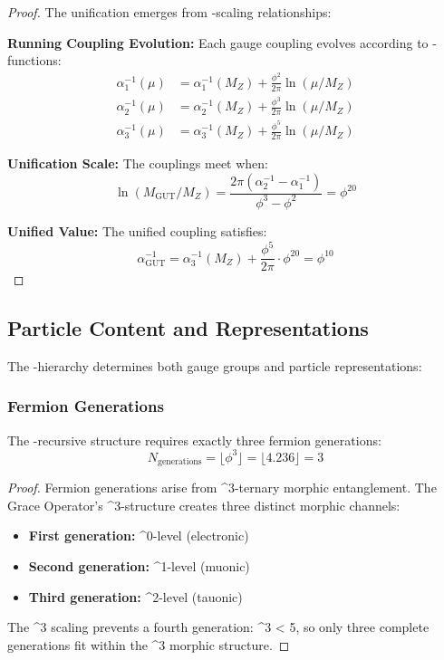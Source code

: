 \begin{proof}
The unification emerges from \phi-scaling relationships:

\textbf{Running Coupling Evolution:} Each gauge coupling evolves according to \phi-\beta functions:
\begin{align}
\alpha_1^{-1}(\mu) &= \alpha_1^{-1}(M_Z) + \frac{\phi^2}{2π} \ln(\mu/M_Z) \\
\alpha_2^{-1}(\mu) &= \alpha_2^{-1}(M_Z) + \frac{\phi^3}{2π} \ln(\mu/M_Z) \\
\alpha_3^{-1}(\mu) &= \alpha_3^{-1}(M_Z) + \frac{\phi^5}{2π} \ln(\mu/M_Z)
\end{align}

\textbf{Unification Scale:} The couplings meet when:
\begin{equation}
\ln(M_{\text{GUT}}/M_Z) = \frac{2π(\alpha_2^{-1} - \alpha_1^{-1})}{\phi^3 - \phi^2} = \phi^{20}
\end{equation}

\textbf{Unified Value:} The unified coupling satisfies:
\begin{equation}
\alpha_{\text{GUT}}^{-1} = \alpha_3^{-1}(M_Z) + \frac{\phi^5}{2π} \cdot \phi^{20} = \phi^{10}
\end{equation}
\end{proof}

\subsection{Particle Content and Representations}

The \phi-hierarchy determines both gauge groups and particle representations:

\subsubsection{Fermion Generations}

\begin{theorem}
The \phi-recursive structure requires exactly three fermion generations:
\begin{equation}
N_{\text{generations}} = \lfloor \phi^3 \rfloor = \lfloor 4.236 \rfloor = 3
\label{eq:three_generations}
\end{equation}
\end{theorem}

\begin{proof}
Fermion generations arise from \phi^3-ternary morphic entanglement. The Grace Operator's \phi^3-structure creates three distinct morphic channels:

\begin{itemize}
\item \textbf{First generation:} \phi^0-level (electronic)
\item \textbf{Second generation:} \phi^1-level (muonic)  
\item \textbf{Third generation:} \phi^2-level (tauonic)
\end{itemize}

The \phi^3 scaling prevents a fourth generation: \phi^3  < 5, so only three complete generations fit within the \phi^3 morphic structure.
\end{proof}

